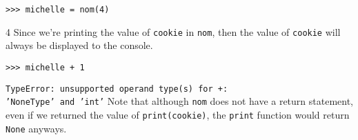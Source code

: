 \begin{blocksection}
\begin{lstlisting}
>>> michelle = nom(4)
\end{lstlisting}
\begin{solution}[0.3in]
4
\newline
\newline
Since we're printing the value of \texttt{cookie} in \texttt{nom}, then the
value of \texttt{cookie} will always be displayed to the console.
\end{solution}
\begin{lstlisting}
>>> michelle + 1
\end{lstlisting}
\begin{solution}[1in]
\texttt{TypeError: unsupported operand type(s) for +:\\
'NoneType' and 'int'}
\newline
\newline
Note that although \texttt{nom} does not have a return statement, even if we
returned the value of \texttt{print(cookie)}, the \texttt{print} function would
return \texttt{None} anyways.
\end{solution}
\end{blocksection}

